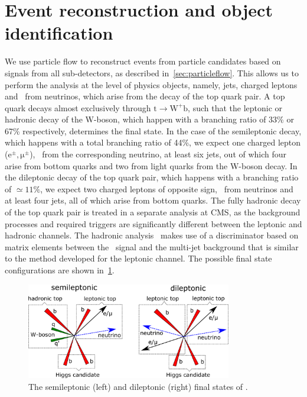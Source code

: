 \section{Event reconstruction and object identification}
\label{sec:object_id}
We use particle flow to reconstruct events from particle candidates based on signals from all sub-detectors, as described in~\cref{sec:particleflow}. This allows us to perform the analysis at the level of physics objects, namely, jets, charged leptons and \MET~from neutrinos, which arise from the decay of the top quark pair. A top quark decays almost exclusively through $\mathrm{t} \rightarrow \mathrm{W}^+ \mathrm{b}$, such that the leptonic or hadronic decay of the W-boson, which happen with a branching ratio of 33\% or 67\% respectively, determines the final state. In the case of the semileptonic decay, which happens with a total branching ratio of 44\%, we expect one charged lepton ($\mathrm{e}^\pm, \mathrm{\mu}^\pm$), \MET~from the corresponding neutrino, at least six jets, out of which four arise from bottom quarks and two from light quarks from the W-boson decay. In the dileptonic decay of the top quark pair, which happens with a branching ratio of $\simeq11\%$, we expect two charged leptons of opposite sign, \MET~from neutrinos and at least four jets, all of which arise from bottom quarks. The fully hadronic decay of the top quark pair is treated in a separate analysis at CMS, as the background processes and required triggers are significantly different between the leptonic and hadronic channels. The hadronic analysis~\cite{CMS:2017_tthfh} makes use of a discriminator based on matrix elements between the \ttH~signal and the multi-jet background that is similar to the method developed for the leptonic channel. The possible final state configurations are shown in~\cref{fig:tth_finalstate}.


\begin{figure}
\begin{centering}
\includegraphics[width=0.8\textwidth]{figures/tth/finalstate.pdf}
\caption[\ttHbb~leptonic final states]{The semileptonic (left) and dileptonic (right) final states of \ttHbb.}
\label{fig:tth_finalstate}
\end{centering}
\end{figure}


